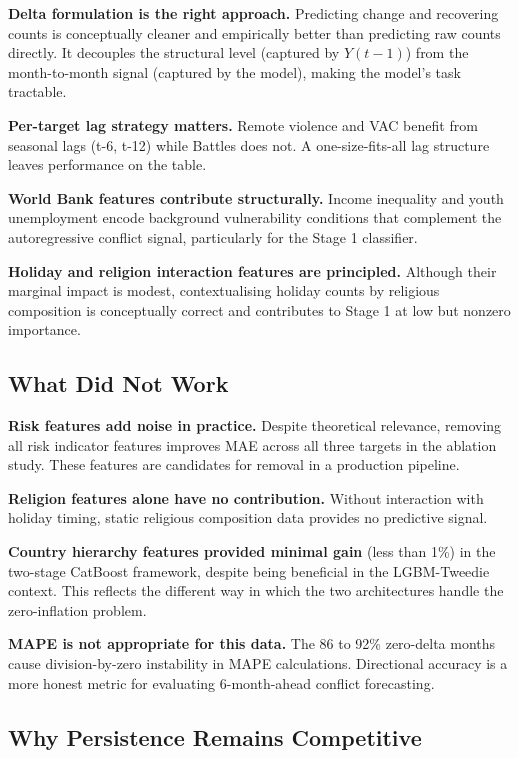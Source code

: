 \documentclass[12pt,a4paper]{article}
\begin{document}
\textbf{Delta formulation is the right approach.} Predicting change and
recovering counts is conceptually cleaner and empirically better than
predicting raw counts directly. It decouples the structural level
(captured by $Y(t-1)$) from the month-to-month signal (captured by the
model), making the model's task tractable.

\textbf{Per-target lag strategy matters.} Remote violence and VAC
benefit from seasonal lags (t-6, t-12) while Battles does not. A
one-size-fits-all lag structure leaves performance on the table.

\textbf{World Bank features contribute structurally.} Income inequality
and youth unemployment encode background vulnerability conditions that
complement the autoregressive conflict signal, particularly for the
Stage 1 classifier.

\textbf{Holiday and religion interaction features are principled.}
Although their marginal impact is modest, contextualising holiday counts
by religious composition is conceptually correct and contributes to
Stage 1 at low but nonzero importance.

\subsection{What Did Not Work}

\textbf{Risk features add noise in practice.} Despite theoretical
relevance, removing all risk indicator features improves MAE across
all three targets in the ablation study. These features are candidates
for removal in a production pipeline.

\textbf{Religion features alone have no contribution.} Without
interaction with holiday timing, static religious composition data
provides no predictive signal.

\textbf{Country hierarchy features provided minimal gain} (less than
1\%) in the two-stage CatBoost framework, despite being beneficial
in the LGBM-Tweedie context. This reflects the different way in which
the two architectures handle the zero-inflation problem.

\textbf{MAPE is not appropriate for this data.} The 86 to 92\%
zero-delta months cause division-by-zero instability in MAPE
calculations. Directional accuracy is a more honest metric for
evaluating 6-month-ahead conflict forecasting.

\subsection{Why Persistence Remains Competitive}
\end{document}
